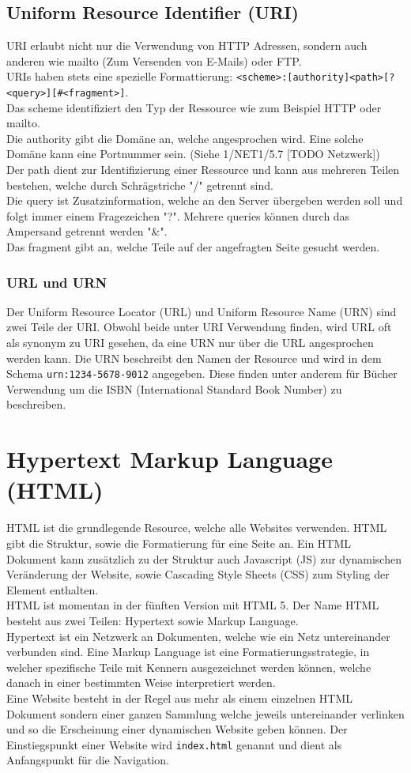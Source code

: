 \documentclass{article}
\begin{document}
	\subsection{Uniform Resource Identifier (URI)}
	URI erlaubt nicht nur die Verwendung von HTTP Adressen, sondern auch anderen wie mailto (Zum Versenden von E-Mails) oder FTP. \\
	URIs haben stets eine spezielle Formattierung: \verb|<scheme>:[authority]<path>[?<query>][#<fragment>]|. \\
	Das scheme identifiziert den Typ der Ressource wie zum Beispiel HTTP oder mailto. \\
	Die authority gibt die Domäne an, welche angesprochen wird. Eine solche Domäne kann eine Portnummer sein. (Siehe 1/NET1/5.7 [TODO Netzwerk]) \\
	Der path dient zur Identifizierung einer Ressource und kann aus mehreren Teilen bestehen, welche durch  Schrägstriche "/" getrennt sind.\\
	Die query ist Zusatzinformation, welche an den Server übergeben werden soll und folgt immer einem Fragezeichen "?". Mehrere queries können durch das Ampersand getrennt werden "\&". \\
	Das fragment gibt an, welche Teile auf der angefragten Seite gesucht werden.
	\subsubsection{URL und URN}
	Der Uniform Resource Locator (URL) und Uniform Resource Name (URN) sind zwei Teile der URI. Obwohl beide unter URI Verwendung finden, wird URL oft als synonym zu URI gesehen, da eine URN nur über die URL angesprochen werden kann. Die URN beschreibt den Namen der Resource und wird in dem Schema \texttt{urn:1234-5678-9012} angegeben. Diese finden unter anderem für Bücher Verwendung um die ISBN (International Standard Book Number) zu beschreiben.
	\section{Hypertext Markup Language (HTML)}
	HTML ist die grundlegende Resource, welche alle Websites verwenden. HTML gibt die Struktur, sowie die Formatierung für eine Seite an. Ein HTML Dokument kann zusätzlich zu der Struktur auch Javascript (JS) zur dynamischen Veränderung der Website, sowie Cascading Style Sheets (CSS) zum Styling der Element enthalten. \\
	HTML ist momentan in der fünften Version mit HTML 5. Der Name HTML besteht aus zwei Teilen: Hypertext sowie Markup Language. \\
	Hypertext ist ein Netzwerk an Dokumenten, welche wie ein Netz untereinander verbunden sind. Eine Markup Language ist eine Formatierungsstrategie, in welcher spezifische Teile mit Kennern ausgezeichnet werden können, welche danach in einer bestimmten Weise interpretiert werden. \\
	Eine Website besteht in der Regel aus mehr als einem einzelnen HTML Dokument sondern einer ganzen Sammlung welche jeweils untereinander verlinken und so die Erscheinung einer dynamischen Website geben können. Der Einstiegspunkt einer Website wird \texttt{index.html} genannt und dient als Anfangspunkt für die Navigation. \\
\end{document}
